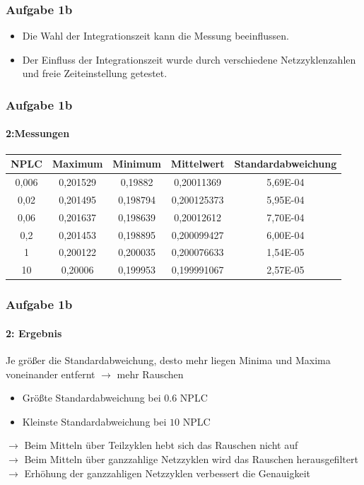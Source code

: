 \begin{frame}
\frametitle{Aufgabe 1b}
\begin{itemize}
    \item Die Wahl der Integrationszeit kann die Messung beeinflussen.
    \item Der Einfluss der Integrationszeit wurde durch verschiedene
    Netzzyklenzahlen und freie Zeiteinstellung getestet.
\end{itemize}
\end{frame}
\begin{frame}
\frametitle{Aufgabe 1b}
\framesubtitle{2:Messungen}
\begin{tabular}{c|c c c c}
    NPLC   & Maximum    & Minimum    & Mittelwert  &Standardabweichung \\
    \hline
    0,006  & 0,201529   & 0,19882    & 0,20011369  &5,69E-04\\
    0,02   & 0,201495   & 0,198794   & 0,200125373 &5,95E-04\\
    0,06   & 0,201637   & 0,198639   & 0,20012612  &7,70E-04\\
    0,2    & 0,201453   & 0,198895   & 0,200099427 &6,00E-04\\
    1      & 0,200122   & 0,200035   & 0,200076633 &1,54E-05\\
    10     & 0,20006    & 0,199953   & 0,199991067 &2,57E-05
\end{tabular}
\end{frame}
\begin{frame}
\frametitle{Aufgabe 1b}
\framesubtitle{2: Ergebnis}
     Je größer die Standardabweichung, desto mehr liegen Minima und Maxima
     voneinander entfernt $\rightarrow$ mehr Rauschen
     \begin{itemize}
         \item Größte Standardabweichung bei $0.6$ NPLC
         \item Kleinste Standardabweichung bei $10$ NPLC
     \end{itemize}
     $\rightarrow$ Beim Mitteln über Teilzyklen hebt sich das Rauschen nicht
     auf \\
     $\rightarrow$ Beim Mitteln über ganzzahlige Netzzyklen wird das Rauschen
     herausgefiltert \\
     $\rightarrow$ Erhöhung der ganzzahligen Netzzyklen verbessert die
     Genauigkeit
\end{frame}
